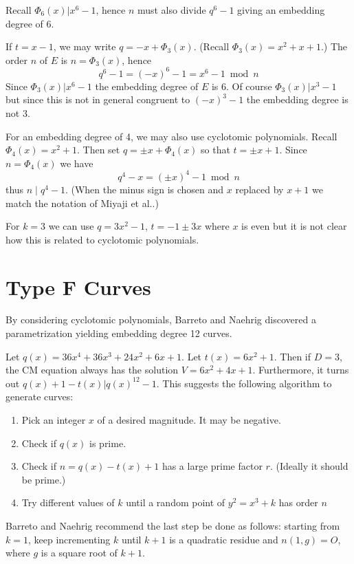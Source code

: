 Recall $\Phi_6(x) | x^6 - 1$, hence $n$ must also divide $q^6 - 1$
giving an embedding degree of 6.

If $t = x - 1$, we may write $q = -x + \Phi_3(x)$.
(Recall $\Phi_3(x) = x^2 + x + 1$.)
The order $n$ of $E$ is $n = \Phi_3(x)$, hence
\[ q^6 - 1 = (-x)^6 - 1 = x^6 - 1 \bmod n \]
Since $\Phi_3(x) | x^6 - 1$ the embedding degree of $E$ is 6.
Of course $\Phi_3(x) | x^3 - 1$ but since this is not in general
congruent to $(-x)^3 - 1$ the embedding degree is not 3.

For an embedding degree of 4, we may also use cyclotomic polynomials.
Recall $\Phi_4(x) = x^2 + 1$. Then set $q = \pm x + \Phi_4(x)$
so that $t = \pm x + 1$. Since $n = \Phi_4(x)$ we have
\[ q^4 - x = (\pm x)^4 - 1 \bmod n \]
thus $n \mid q^4 - 1$.
(When the minus sign is chosen and $x$ replaced by $x+1$ 
we match the notation of Miyaji et al.\cite{mnt}.)

For $k=3$ we can use $q = 3 x^2 - 1$, $t = -1 \pm 3x$ where $x$ is
even but it is not clear how this is related to cyclotomic polynomials.

\section { Type F Curves }

By considering cyclotomic polynomials,
Barreto and Naehrig discovered a parametrization yielding embedding
degree 12 curves.

Let $q(x) = 36x^4 + 36x^3 + 24x^2 + 6x + 1$. Let $t(x) = 6x^2 + 1$.
Then if $D = 3$, the CM equation always has the solution
$V = 6x^2 + 4x + 1$. Furthermore,
it turns out $q(x) + 1 - t(x) | q(x)^{12} - 1$.
This suggests the following algorithm to generate curves:

\begin{enumerate}
\item
Pick an integer $x$ of a desired magnitude. It may be negative.
\item
Check if $q(x)$ is prime.
\item
Check if $n = q(x) - t(x) + 1$ has a large prime factor $r$.
(Ideally it should be prime.)
\item
Try different values of $k$ until a random point of
$y^2 = x^3 + k$ has order $n$
\end{enumerate}

Barreto and Naehrig recommend the last step be done as follows:
starting from $k = 1$, keep incrementing $k$ until $k+1$ is a quadratic
residue and $n(1,g) = O$, where $g$ is a square root of $k + 1$.

